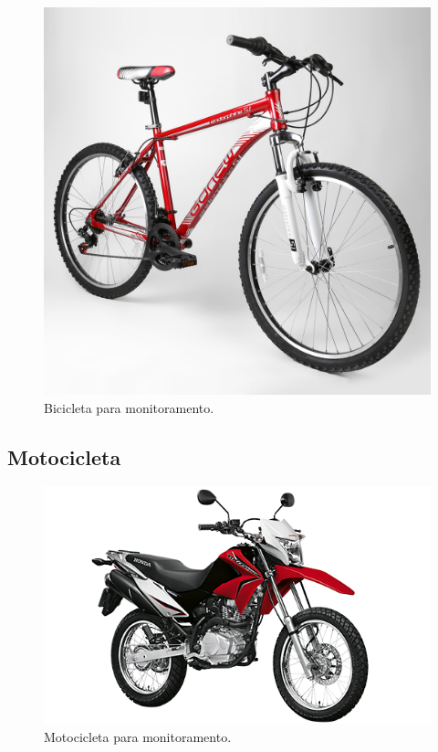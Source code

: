\begin{figure}[H]
	\centering
	\label{Bicicleta para monitoramento.}
		\includegraphics[keepaspectratio=true,scale=0.2]{monitoramento/Bicicleta.jpg}
	\caption{Bicicleta para monitoramento.}
\end{figure}

\subsection{Motocicleta}

\begin{figure}[H]
	\centering
	\label{Motocicleta para monitoramento.}
		\includegraphics[keepaspectratio=true,scale=2.0]{monitoramento/Moto.png}
	\caption{Motocicleta para monitoramento.}
\end{figure}

